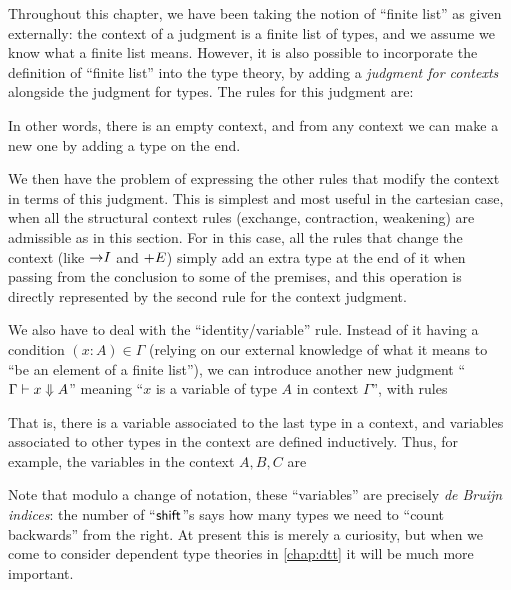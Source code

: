 \begin{rmk}\label{rmk:ctx-judgment}
  Throughout this chapter, we have been taking the notion of ``finite list'' as given externally: the context of a judgment is a finite list of types, and we assume we know what a finite list means.
  However, it is also possible to incorporate the definition of ``finite list'' into the type theory, by adding a \emph{judgment for contexts} alongside the judgment for types.
  The rules for this judgment are:
  In other words, there is an empty context, and from any context we can make a new one by adding a type on the end.

  We then have the problem of expressing the other rules that modify the context in terms of this judgment.
  This is simplest and most useful in the cartesian case, when all the structural context rules (exchange, contraction, weakening) are admissible as in this section.
  For in this case, all the rules that change the context (like $\mathord{\to}I$ and $\mathord{+}E$) simply add an extra type at the end of it when passing from the conclusion to some of the premises, and this operation is directly represented by the second rule for the context judgment.

  We also have to deal with the ``identity/variable'' rule.
  Instead of it having a condition $(x:A)\in \Gamma$ (relying on our external knowledge of what it means to ``be an element of a finite list''), we can introduce another new judgment ``$\Gamma \vdash x\mathrel{\Downarrow} A$'' meaning ``$x$ is a variable of type $A$ in context $\Gamma$'', with rules
  That is, there is a variable associated to the last type in a context, and variables associated to other types in the context are defined inductively.
  Thus, for example, the variables in the context $A,B,C$ are
  Note that modulo a change of notation, these ``variables'' are precisely \emph{de Bruijn indices}: the number of ``$\mathsf{shift}$''s says how many types we need to ``count backwards'' from the right.
  At present this is merely a curiosity, but when we come to consider dependent type theories in \cref{chap:dtt} it will be much more important.
\end{rmk}


